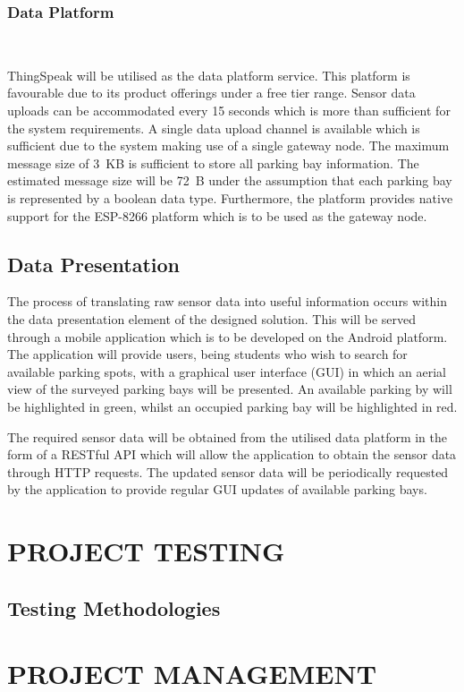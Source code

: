 \documentclass[10pt,twocolumn]{witseiepaper}
\begin{document}
	\subsubsection{Data Platform} $   $
	
		ThingSpeak will be utilised as the data platform service. This platform is favourable due to its product offerings under a free tier range. Sensor data uploads can be accommodated every 15 seconds which is more than sufficient for the system requirements. A single data upload channel is available which is sufficient due to the system making use of a single gateway node. The maximum message size of 3~KB is sufficient to store all parking bay information. The estimated message size will be 72~B under the assumption that each parking bay is represented by a boolean data type. Furthermore, the platform provides native support for the ESP-8266 platform which is to be used as the gateway node.

	\subsection{Data Presentation}
	
		The process of translating raw sensor data into useful information occurs within the data presentation element of the designed solution. This will be served through a mobile application which is to be developed on the Android platform. The application will provide users, being students who wish to search for available parking spots, with a graphical user interface (GUI) in which an aerial view of the surveyed parking bays will be presented. An available parking by will be highlighted in green, whilst an occupied parking bay will be highlighted in red.

		The required sensor data will be obtained from the utilised data platform in the form of a RESTful API which will allow the application to obtain the sensor data through HTTP requests. The updated sensor data will be periodically requested by the application to provide regular GUI updates of available parking bays.
	
\section{PROJECT TESTING}
	\subsection{Testing Methodologies}


\section{PROJECT MANAGEMENT}
\end{document}
